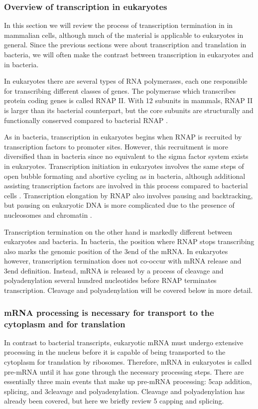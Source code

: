 %
\subsubsection{Overview of transcription in eukaryotes}
In this section we will review the process of transcription termination in in
mammalian cells, although much of the material is applicable to eukaryotes in
general. Since the previous sections were about transcription and translation
in bacteria, we will often make the contrast between transcription in
eukaryotes and in bacteria.

In eukaryotes there are several types of RNA polymerases, each one responsible
for transcribing different classes of genes. The polymerase which transcribes
protein coding genes is called RNAP II. With 12 subunits in mammals, RNAP II is
larger than its bacterial counterpart, but the core subunits are structurally
and functionally conserved compared to bacterial RNAP \cite{ebright_rna_2000}.

As in bacteria, transcription in eukaryotes begins when RNAP is recruited by
transcription factors to promoter sites. However, this recruitment is more
diversified than in bacteria since no equivalent to the sigma factor system
exists in eukaryotes. Transcription initiation in eukaryotes involves the same
steps of open bubble formating and abortive cycling as in bacteria, although
additional assisting transcription factors are involved in this process
compared to bacterial cells \cite{wade_transition_2008}. Transcription
elongation by RNAP also involves pausing and backtracking, but pausing on
eukaryotic DNA is more complicated due to the presence of nucleosomes and
chromatin \cite{sims_elongation_2004}.

Transcription termination on the other hand is markedly different between
eukaryotes and bacteria. In bacteria, the position where RNAP stops
transcribing also marks the genomic position of the 3\p end of the mRNA. In
eukaryotes however, transcription termination does not co-occur with mRNA
release and 3\p end definition. Instead, mRNA is released by a process of
cleavage and polyadenylation several hundred nucleotides before RNAP terminates
transcription. Cleavage and polyadenylation will be covered below in more
detail.

\subsubsection{mRNA processing is necessary for transport to the cytoplasm and
for translation}
In contrast to bacterial transcripts, eukaryotic mRNA must undergo extensive
processing in the nucleus before it is capable of being transported to the
cytoplasm for translation by ribosomes. Therefore, mRNA in eukaryotes is called
pre-mRNA until it has gone through the necessary processing steps. There are
essentially three main events that make up pre-mRNA processing: 5\p cap
addition, splicing, and 3\p cleavage and polyadenylation. Cleavage and
polyadenylation has already been covered, but here we briefly review 5\p
capping and splicing.

